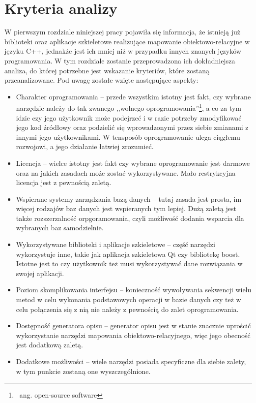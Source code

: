 \documentclass[12pt]{report}
\begin{document}
\section{Kryteria analizy}

W pierwszym rozdziale niniejszej pracy pojawiła się informacja, że istnieją już biblioteki oraz aplikacje szkieletowe realizujące mapowanie obiektowo-relacyjne w języku C++,
jednakże jest ich mniej niż w przypadku innych znanych języków programowania. W tym rozdziale zostanie przeprowadzona ich dokładniejsza analiza, do której potrzebne
jest wskazanie kryteriów, które zostaną przeanalizowane. Pod uwagę zostałe wzięte następujące aspekty:

\begin{itemize}
\item Charakter oprogramowania -- przede wszystkim istotny jest fakt, czy wybrane narzędzie należy do tak zwanego ,,wolnego oprogramowania''\footnote{~ang. open-source
software}, a co za tym idzie czy jego użytkownik może podejrzeć i w razie potrzeby zmodyfikować jego kod źródłowy oraz podzielić się wprowadzonymi przez siebie zmianami z innymi 
jego użytkownikami. W tensposób oprogramowanie ulega ciągłemu rozwojowi, a jego działanie łatwiej zrozumieć.
\item Licencja -- wielce istotny jest fakt czy wybrane oprogramowanie jest darmowe oraz na jakich zasadach może zostać wykorzystywane. Mało restrykcyjna licencja jest z
pewnością zaletą.
\item Wspierane systemy zarządzania bazą danych -- tutaj zasada jest prosta, im więcej rodzajów baz danych jest wspieranych tym lepiej. Dużą zaletą jest także rozszerzalność
orpgoramowania, czyli możliwość dodania wsparcia dla wybranych baz samodzielnie.
\item Wykorzystywane biblioteki i aplikacje szkieletowe -- część narzędzi wykorzystuje inne, takie jak aplikacja szkieletowa Qt czy bibliotekę boost. Istotne jest to czy użytkownik
też musi wykorzystywać dane rozwiązania w swojej aplikacji.
\item Poziom skomplikowania interfejsu -- konieczność wywoływania sekwencji wielu metod w celu wykonania podstawowych operacji w bazie danych czy też w celu połączenia
się z nią nie należy z pewnością do zalet oprogramowania.
\item Dostępność generatora opisu -- generator opisu jest w stanie znacznie uprościć wykorzystanie narzędzi mapowania obiektowo-relacyjnego, więc jego obecność jest
dodatkową zaletą.
\item Dodatkowe możliwości -- wiele narzędzi posiada specyficzne dla siebie zalety, w tym punkcie zostaną one wyszczególnione.
\end{itemize}
\end{document}
